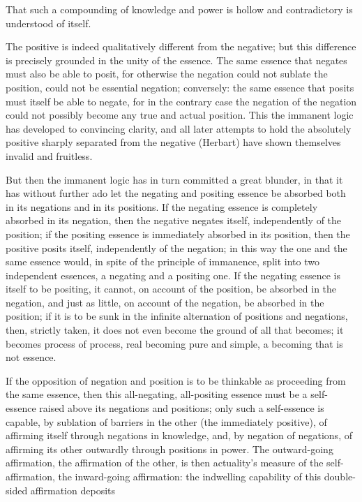 \documentclass[12pt]{book}
\begin{document}
That such a compounding of knowledge and power is hollow and
contradictory is understood of itself.

The positive is indeed qualitatively different from the negative;
but this difference is precisely grounded in the unity of the
essence. The same essence that negates must also be able to posit,
for otherwise the negation could not sublate the position, could not
be essential negation; conversely: the same essence that posits must
itself be able to negate, for in the contrary case the negation of
the negation could not possibly become any true and actual position.
This the immanent logic has developed to convincing clarity, and all
later attempts to hold the absolutely positive sharply separated
from the negative (Herbart) have shown themselves invalid and
fruitless.

But then the immanent logic has in turn committed a great blunder,
in that it has without further ado let the negating and positing
essence be absorbed both in its negations and in its positions. If
the negating essence is completely absorbed in its negation, then
the negative negates itself, independently of the position; if the
positing essence is immediately absorbed in its position, then the
positive posits itself,
independently of the negation; in this way the one and the same
essence would, in spite of the principle of immanence, split into
two independent essences, a negating and a positing one. If the
negating essence is itself to be positing, it cannot, on account of
the position, be absorbed in the negation, and just as little, on
account of the negation, be absorbed in the position; if it is to be
sunk in the infinite alternation of positions and negations, then,
strictly taken, it does not even become the ground of all that
becomes; it becomes process of process, real becoming pure and
simple, a becoming that is not essence.

If the opposition of negation and position is to be thinkable as
proceeding from the same essence, then this all-negating,
all-positing essence must be a self-essence raised above its
negations and positions; only such a self-essence is capable, by
sublation of barriers in the other (the immediately positive), of
affirming itself through negations in knowledge, and, by negation of
negations, of affirming its other outwardly through positions in
power. The outward-going affirmation, the affirmation of the other,
is then actuality's measure of the self-affirmation, the
inward-going affirmation: the indwelling capability of this
double-sided affirmation deposits
\end{document}
